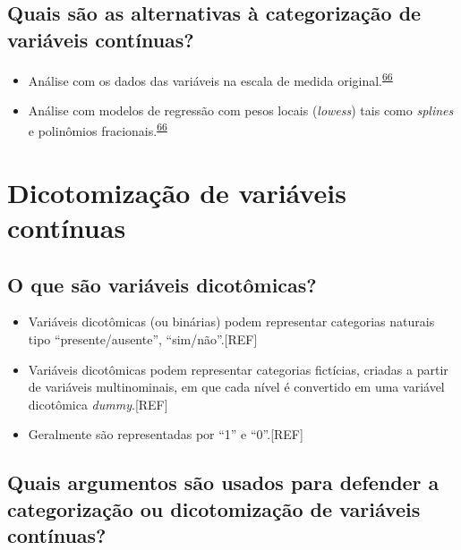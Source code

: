\documentclass[
  a4paper,
]{book}
\begin{document}
\hypertarget{quais-suxe3o-as-alternativas-uxe0-categorizauxe7uxe3o-de-variuxe1veis-contuxednuas}{%
\subsection{Quais são as alternativas à categorização de variáveis contínuas?}\label{quais-suxe3o-as-alternativas-uxe0-categorizauxe7uxe3o-de-variuxe1veis-contuxednuas}}

\begin{itemize}
\item
  Análise com os dados das variáveis na escala de medida original.\textsuperscript{\protect\hyperlink{ref-MacCallum2002}{66}}
\item
  Análise com modelos de regressão com pesos locais (\emph{lowess}) tais como \emph{splines} e polinômios fracionais.\textsuperscript{\protect\hyperlink{ref-MacCallum2002}{66}}
\end{itemize}

\hypertarget{dicotomizacao}{%
\section{Dicotomização de variáveis contínuas}\label{dicotomizacao}}

\hypertarget{o-que-suxe3o-variuxe1veis-dicotuxf4micas}{%
\subsection{O que são variáveis dicotômicas?}\label{o-que-suxe3o-variuxe1veis-dicotuxf4micas}}

\begin{itemize}
\item
  Variáveis dicotômicas (ou binárias) podem representar categorias naturais tipo ``presente/ausente'', ``sim/não''.{[}REF{]}
\item
  Variáveis dicotômicas podem representar categorias fictícias, criadas a partir de variáveis multinominais, em que cada nível é convertido em uma variável dicotômica \emph{dummy}.{[}REF{]}
\item
  Geralmente são representadas por ``1'' e ``0''.{[}REF{]}
\end{itemize}

\hypertarget{quais-argumentos-suxe3o-usados-para-defender-a-categorizauxe7uxe3o-ou-dicotomizauxe7uxe3o-de-variuxe1veis-contuxednuas}{%
\subsection{Quais argumentos são usados para defender a categorização ou dicotomização de variáveis contínuas?}\label{quais-argumentos-suxe3o-usados-para-defender-a-categorizauxe7uxe3o-ou-dicotomizauxe7uxe3o-de-variuxe1veis-contuxednuas}}
\end{document}
